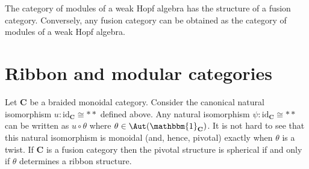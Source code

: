     \begin{theorem}
        The category of modules of a weak Hopf algebra has the structure of a fusion category. Conversely, any fusion category can be obtained as the category of modules of a weak Hopf algebra.
    \end{theorem}

\section{Ribbon and modular categories}


    \begin{property}
        Let $\mathbf{C}$ be a braided monoidal category. Consider the canonical natural isomorphism $u:\mathrm{id}_{\mathbf{C}}\cong\ast\ast$ defined above. Any natural isomorphism $\psi:\mathrm{id}_{\mathbf{C}}\cong\ast\ast$ can be written as $u\circ\theta$ where $\theta\in\Aut(\mathbbm{1}_{\mathbf{C}})$. It is not hard to see that this natural isomorphism is monoidal (and, hence, pivotal) exactly when $\theta$ is a twist. If $\mathbf{C}$ is a fusion category then the pivotal structure is spherical if and only if $\theta$ determines a ribbon structure.
    \end{property}

